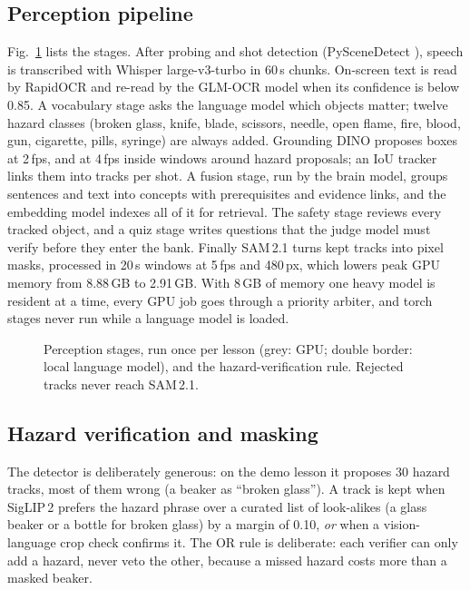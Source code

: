 \documentclass[conference,a4paper]{IEEEtran}
\newcommand{\fig}[1]{Fig.~\ref{#1}}
\begin{document}
\subsection{Perception pipeline}
\fig{fig:pipe} lists the stages. After probing and shot detection (PySceneDetect \cite{pyscenedetect}), speech is transcribed with Whisper
large-v3-turbo \cite{whisper} in 60\,s chunks. On-screen text is read by RapidOCR \cite{rapidocr} and re-read by the
GLM-OCR model when its confidence is below 0.85. A vocabulary stage asks the language model which objects matter; twelve
hazard classes (broken glass, knife, blade, scissors, needle, open flame, fire, blood, gun, cigarette, pills, syringe)
are always added. Grounding DINO \cite{groundingdino} proposes boxes at 2\,fps, and at 4\,fps inside windows around
hazard proposals; an IoU tracker links them into tracks per shot. A fusion stage, run by the brain model, groups
sentences and text into concepts with prerequisites and evidence links, and the embedding model \cite{qwen3emb} indexes
all of it for retrieval. The safety stage reviews every tracked object, and a quiz stage writes questions that the judge
model must verify before they enter the bank. Finally SAM\,2.1 \cite{sam2} turns kept tracks into pixel masks, processed
in 20\,s windows at 5\,fps and 480\,px, which lowers peak GPU memory from 8.88\,GB to 2.91\,GB. With 8\,GB of memory one
heavy model is resident at a time, every GPU job goes through a priority arbiter, and torch stages never run while a
language model is loaded.

\begin{figure}[t]
\centering
\resizebox{0.8\textwidth}{!}{}
\caption{Perception stages, run once per lesson (grey: GPU; double border: local language model), and the
hazard-verification rule. Rejected tracks never reach SAM\,2.1.}
\label{fig:pipe}
\end{figure}

\subsection{Hazard verification and masking}
The detector is deliberately generous: on the demo lesson it proposes 30 hazard tracks, most of them wrong (a beaker as
``broken glass''). A track is kept when SigLIP\,2 \cite{siglip2} prefers the hazard phrase over a curated list of
look-alikes (a glass beaker or a bottle for broken glass) by a margin of 0.10, \emph{or} when a vision-language crop
check confirms it. The OR rule is deliberate: each verifier can only add a hazard, never veto the other, because a
missed hazard costs more than a masked beaker.
\end{document}
